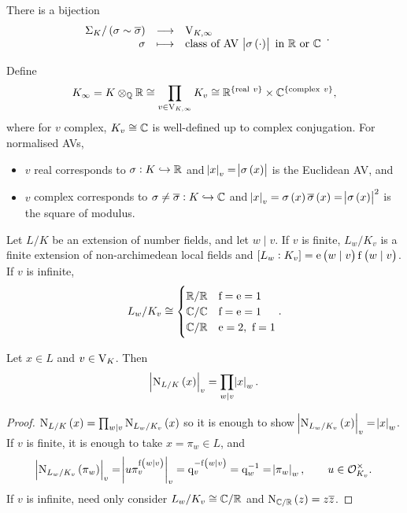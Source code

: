 \begin{theorem}
There is a bijection
$$ \function{\Sigma_K / \br{\sigma \sim \overline{\sigma}}}{\V_{K, \infty}}{\sigma}{\text{class of AV} \ \abs{\sigma\br{\cdot}} \ \text{in} \ \RR \ \text{or} \ \CC}. $$
\end{theorem}

\pagebreak

\begin{notation*}
Define
$$ K_\infty = K \otimes_\QQ \RR \cong \prod_{v \in \V_{K, \infty}} K_v \cong \RR^{\cbr{\text{real} \ v}} \times \CC^{\cbr{\text{complex} \ v}}, $$
where for $ v $ complex, $ K_v \cong \mathbb{C} $ is well-defined up to complex conjugation. For normalised AVs,
\begin{itemize}
\item $ v $ real corresponds to $ \sigma : K \hookrightarrow \mathbb{R} $ and $ \abs{x}_v = \abs{\sigma\br{x}} $ is the Euclidean AV, and
\item $ v $ complex corresponds to $ \sigma \ne \overline{\sigma} : K \hookrightarrow \mathbb{C} $ and $ \abs{x}_v = \sigma\br{x}\overline{\sigma}\br{x} = \abs{\sigma\br{x}}^2 $ is the square of modulus.
\end{itemize}
\end{notation*}

Let $ L / K $ be an extension of number fields, and let $ w \mid v $. If $ v $ is finite, $ L_w / K_v $ is a finite extension of non-archimedean local fields and $ \sbr{L_w : K_v} = \e\br{w \mid v}\f\br{w \mid v} $. If $ v $ is infinite,
$$ L_w / K_v \cong
\begin{cases}
\mathbb{R} / \mathbb{R} & \mathrm{f} = \mathrm{e} = 1 \\
\mathbb{C} / \mathbb{C} & \mathrm{f} = \mathrm{e} = 1 \\
\mathbb{C} / \mathbb{R} & \mathrm{e} = 2, \ \mathrm{f} = 1
\end{cases}.
$$


\begin{proposition}
Let $ x \in L $ and $ v \in \mathrm{V}_K $. Then
$$ \abs{\N_{L / K}\br{x}}_v = \prod_{w \mid v} \abs{x}_w. $$
\end{proposition}

\begin{proof}
$ \N_{L / K}\br{x} = \prod_{w \mid v} \N_{L_w / K_v}\br{x} $ so it is enough to show $ \abs{\N_{L_w / K_v}\br{x}}_v = \abs{x}_w $. If $ v $ is finite, it is enough to take $ x = \pi_w \in L $, and
$$ \abs{\N_{L_w / K_v}\br{\pi_w}}_v = \abs{u\pi_v^{\f\br{w \mid v}}}_v = \q_v^{-\f\br{w \mid v}} = \q_w^{-1} = \abs{\pi_w}_w, \qquad u \in \OOO_{K_v}^\times. $$
If $ v $ is infinite, need only consider $ L_w / K_v \cong \mathbb{C} / \mathbb{R} $ and $ \N_{\CC / \RR}\br{z} = z\overline{z} $.
\end{proof}

